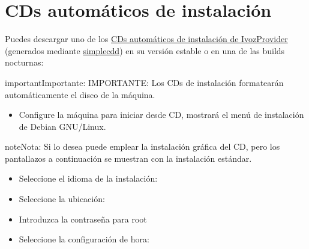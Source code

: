 \documentclass[letterpaper,10pt,spanish]{sphinxmanual}
\begin{document}
\section{CDs automáticos de instalación}
\label{basic_concepts/installation/cd_install::doc}\label{basic_concepts/installation/cd_install:automatic-iso-cd-image}\label{basic_concepts/installation/cd_install:cds-automaticos-de-instalacion}\label{basic_concepts/installation/cd_install:id1}
Puedes descargar uno de los \href{https://github.com/irontec/ivozprovider}{CDs automáticos de instalación de IvozProvider} (generados mediante \href{https://wiki.debian.org/Simple-CDD}{simplecdd}) en su versión estable o en una de las builds nocturnas:

\begin{notice}{important}{Importante:}
IMPORTANTE: Los CDs de instalación formatearán automáticamente el disco de la máquina.
\end{notice}
\begin{itemize}
\item {} 
Configure la máquina para iniciar desde CD, mostrará el menú de instalación de Debian GNU/Linux.

\end{itemize}

\begin{notice}{note}{Nota:}
Si lo desea puede emplear la instalación gráfica del CD, pero los pantallazos a continuación se muestran con la instalación estándar.
\end{notice}

\noindent{}
\begin{itemize}
\item {} 
Seleccione el idioma de la instalación:

\end{itemize}

\noindent{}
\begin{itemize}
\item {} 
Seleccione la ubicación:

\end{itemize}

\noindent{}
\begin{itemize}
\item {} 
Introduzca la contraseña para root

\end{itemize}

\noindent{}
\begin{itemize}
\item {} 
Seleccione la configuración de hora:

\end{itemize}
\end{document}
